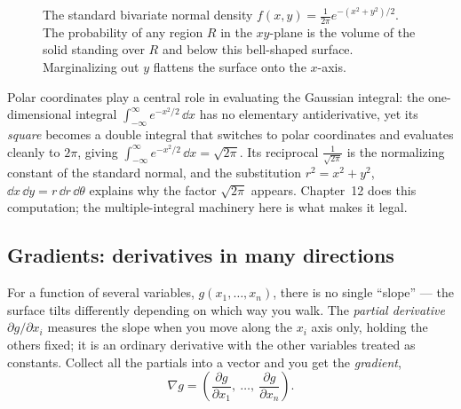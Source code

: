 \begin{figure}[H]
\centering
{}
\caption{The standard bivariate normal density $f(x,y)=\frac{1}{2\pi}e^{-(x^2+y^2)/2}$. The
probability of any region $R$ in the $xy$-plane is the volume of the solid standing over $R$ and below
this bell-shaped surface. Marginalizing out $y$ flattens the surface onto the $x$-axis.}
\label{chAcla:fig-bivariate}
\end{figure}

\begin{connectionbox}
Polar coordinates play a central role in evaluating the Gaussian integral: the
one-dimensional integral $\int_{-\infty}^{\infty} e^{-x^2/2}\,\dd x$ has no elementary
antiderivative, yet its \emph{square}
becomes a double integral that switches to polar coordinates and evaluates cleanly to $2\pi$, giving
$\int_{-\infty}^{\infty} e^{-x^2/2}\,\dd x = \sqrt{2\pi}$. Its reciprocal $\frac{1}{\sqrt{2\pi}}$ is the normalizing constant of the standard normal,
and the substitution $r^2=x^2+y^2$, $\dd x\,\dd y = r\,\dd r\,\dd\theta$ explains why the factor $\sqrt{2\pi}$
appears. Chapter~12 does this computation; the multiple-integral machinery here
is what makes it legal.
\end{connectionbox}

\subsection{Gradients: derivatives in many directions}
\label{chAcla:gradient}

For a function of several variables, $g(x_1,\dots,x_n)$, there is no single ``slope'' --- the surface
tilts differently depending on which way you walk. The \emph{partial derivative} $\partial g/\partial
x_i$ measures the slope when you move along the $x_i$ axis only, holding the others fixed; it is an ordinary derivative with the other variables treated as constants. Collect all the partials into a
vector and you get the \emph{gradient},
\[
  \nabla g = \left(\frac{\partial g}{\partial x_1},\ \dots,\ \frac{\partial g}{\partial x_n}\right).
\]

